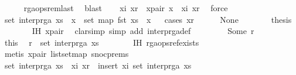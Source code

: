 \begin{isabellebody}
\ \ \ \ \isamarkupfalse%
\ rga{\isacharunderscore}ops{\isacharunderscore}rem{\isacharunderscore}last\ \isamarkupfalse%
\ blast\isanewline
\ \ \isamarkupfalse%
\ xi\ xr\ \ x{\isacharunderscore}pair{\isacharcolon}\ {\isachardoublequoteopen}x\ {\isacharequal}\ {\isacharparenleft}xi{\isacharcomma}\ xr{\isacharparenright}{\isachardoublequoteclose}\ \isamarkupfalse%
\ force\isanewline
\ \ \isamarkupfalse%
\ \isamarkupfalse%
\ {\isachardoublequoteopen}set\ {\isacharparenleft}interp{\isacharunderscore}rga\ {\isacharparenleft}xs\ {\isacharat}\ {\isacharbrackleft}x{\isacharbrackright}{\isacharparenright}{\isacharparenright}\ {\isacharequal}\ set\ {\isacharparenleft}map\ fst\ {\isacharparenleft}xs\ {\isacharat}\ {\isacharbrackleft}x{\isacharbrackright}{\isacharparenright}{\isacharparenright}{\isachardoublequoteclose}\isanewline
\ \ \isamarkupfalse%
{\isacharparenleft}cases\ xr{\isacharparenright}\isanewline
\ \ \ \ \isamarkupfalse%
\ None\isanewline
\ \ \ \ \isamarkupfalse%
\ \isamarkupfalse%
\ {\isacharquery}thesis\isanewline
\ \ \ \ \ \ \isamarkupfalse%
\ IH\ x{\isacharunderscore}pair\ \isamarkupfalse%
\ {\isacharparenleft}clarsimp\ simp\ add{\isacharcolon}\ interp{\isacharunderscore}rga{\isacharunderscore}def{\isacharparenright}\isanewline
\ \ \isamarkupfalse%
\isanewline
\ \ \ \ \isamarkupfalse%
\ {\isacharparenleft}Some\ r{\isacharparenright}\isanewline
\ \ \ \ \isamarkupfalse%
\ \isamarkupfalse%
\ this\ \isamarkupfalse%
\ {\isachardoublequoteopen}r\ {\isasymin}\ set\ {\isacharparenleft}interp{\isacharunderscore}rga\ xs{\isacharparenright}{\isachardoublequoteclose}\isanewline
\ \ \ \ \ \ \isamarkupfalse%
\ IH\ rga{\isacharunderscore}ops{\isacharunderscore}ref{\isacharunderscore}exists\ \isamarkupfalse%
\ {\isacharparenleft}metis\ x{\isacharunderscore}pair\ list{\isachardot}set{\isacharunderscore}map\ snoc{\isachardot}prems{\isacharparenright}\isanewline
\ \ \ \ \isamarkupfalse%
\ \isamarkupfalse%
\ {\isachardoublequoteopen}set\ {\isacharparenleft}interp{\isacharunderscore}rga\ {\isacharparenleft}xs\ {\isacharat}\ {\isacharbrackleft}{\isacharparenleft}xi{\isacharcomma}\ xr{\isacharparenright}{\isacharbrackright}{\isacharparenright}{\isacharparenright}\ {\isacharequal}\ insert\ xi\ {\isacharparenleft}set\ {\isacharparenleft}interp{\isacharunderscore}rga\ xs{\isacharparenright}{\isacharparenright}{\isachardoublequoteclose}\isanewline

\end{isabellebody}
